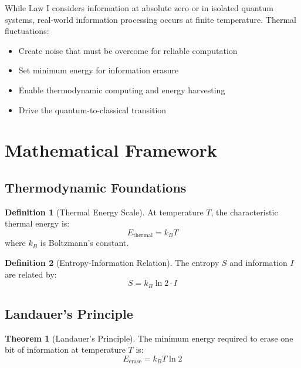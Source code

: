 \documentclass[11pt,a4paper]{article}
\theoremstyle{definition}
\newtheorem{definition}{Definition}[section]
\newtheorem{theorem}{Theorem}[section]
\begin{document}
While Law I considers information at absolute zero or in isolated quantum systems, real-world information processing occurs at finite temperature. Thermal fluctuations:
\begin{itemize}
\item Create noise that must be overcome for reliable computation
\item Set minimum energy for information erasure
\item Enable thermodynamic computing and energy harvesting
\item Drive the quantum-to-classical transition
\end{itemize}

\section{Mathematical Framework}

\subsection{Thermodynamic Foundations}

\begin{definition}[Thermal Energy Scale]
At temperature $T$, the characteristic thermal energy is:
\begin{equation}
E_{\text{thermal}} = k_B T
\end{equation}
where $k_B$ is Boltzmann's constant.
\end{definition}

\begin{definition}[Entropy-Information Relation]
The entropy $S$ and information $I$ are related by:
\begin{equation}
S = k_B \ln 2 \cdot I
\end{equation}
\end{definition}

\subsection{Landauer's Principle}

\begin{theorem}[Landauer's Principle]
The minimum energy required to erase one bit of information at temperature $T$ is:
\begin{equation}
E_{\text{erase}} = k_B T \ln 2
\end{equation}
\end{theorem}
\end{document}
